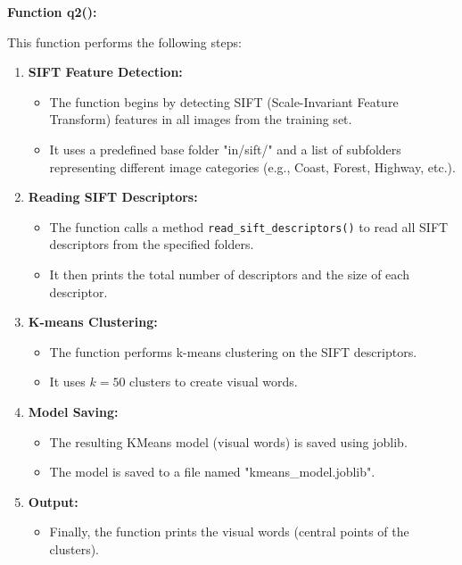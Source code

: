 \documentclass{article}
\begin{document}
   \textbf{Function q2():}

   This function performs the following steps:
   
   \begin{enumerate}
       \item \textbf{SIFT Feature Detection:}
       \begin{itemize}
           \item The function begins by detecting SIFT (Scale-Invariant Feature Transform) features in all images from the training set.
           \item It uses a predefined base folder "in/sift/" and a list of subfolders representing different image categories (e.g., Coast, Forest, Highway, etc.).
       \end{itemize}
   
       \item \textbf{Reading SIFT Descriptors:}
       \begin{itemize}
           \item The function calls a method \texttt{read\_sift\_descriptors()} to read all SIFT descriptors from the specified folders.
           \item It then prints the total number of descriptors and the size of each descriptor.
       \end{itemize}
   
       \item \textbf{K-means Clustering:}
       \begin{itemize}
           \item The function performs k-means clustering on the SIFT descriptors.
           \item It uses $k=50$ clusters to create visual words.
       \end{itemize}
   
       \item \textbf{Model Saving:}
       \begin{itemize}
           \item The resulting KMeans model (visual words) is saved using joblib.
           \item The model is saved to a file named "kmeans\_model.joblib".
       \end{itemize}
   
       \item \textbf{Output:}
       \begin{itemize}
           \item Finally, the function prints the visual words (central points of the clusters).
       \end{itemize}
   \end{enumerate}
   
\end{document}
